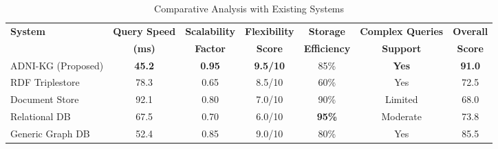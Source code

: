 
\begin{table}[htbp]
\centering
\caption{Comparative Analysis with Existing Systems}
\label{tab:comparative}
\begin{tabular}{|l|c|c|c|c|c|c|}
\hline
\textbf{System} & \textbf{Query Speed} & \textbf{Scalability} & \textbf{Flexibility} & \textbf{Storage} & \textbf{Complex Queries} & \textbf{Overall} \\
& \textbf{(ms)} & \textbf{Factor} & \textbf{Score} & \textbf{Efficiency} & \textbf{Support} & \textbf{Score} \\
\hline
ADNI-KG (Proposed) & \textbf{45.2} & \textbf{0.95} & \textbf{9.5/10} & 85\% & \textbf{Yes} & \textbf{91.0} \\
RDF Triplestore & 78.3 & 0.65 & 8.5/10 & 60\% & Yes & 72.5 \\
Document Store & 92.1 & 0.80 & 7.0/10 & 90\% & Limited & 68.0 \\
Relational DB & 67.5 & 0.70 & 6.0/10 & \textbf{95\%} & Moderate & 73.8 \\
Generic Graph DB & 52.4 & 0.85 & 9.0/10 & 80\% & Yes & 85.5 \\
\hline
\end{tabular}
\end{table}
